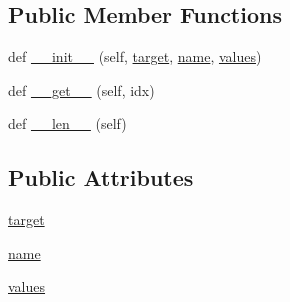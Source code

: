\subsection*{Public Member Functions}
\begin{DoxyCompactItemize}
\item 
def \hyperlink{classcodar_1_1cheetah_1_1parameters_1_1_param_a4c91917ddd306f143286037d02b78034}{\+\_\+\+\_\+init\+\_\+\+\_\+} (self, \hyperlink{classcodar_1_1cheetah_1_1parameters_1_1_param_a5603d43a20cfc6447c3718406ce0669e}{target}, \hyperlink{classcodar_1_1cheetah_1_1parameters_1_1_param_ac9982d62cd18a368a3fbc26541e14209}{name}, \hyperlink{classcodar_1_1cheetah_1_1parameters_1_1_param_aefcc82658f511bddd6605e6ac6e74fbf}{values})
\item 
def \hyperlink{classcodar_1_1cheetah_1_1parameters_1_1_param_ae946fbe90ee7212325e58c9c609b9f60}{\+\_\+\+\_\+get\+\_\+\+\_\+} (self, idx)
\item 
def \hyperlink{classcodar_1_1cheetah_1_1parameters_1_1_param_afe606f18a69519800e93596c1532af8d}{\+\_\+\+\_\+len\+\_\+\+\_\+} (self)
\end{DoxyCompactItemize}
\subsection*{Public Attributes}
\begin{DoxyCompactItemize}
\item 
\hyperlink{classcodar_1_1cheetah_1_1parameters_1_1_param_a5603d43a20cfc6447c3718406ce0669e}{target}
\item 
\hyperlink{classcodar_1_1cheetah_1_1parameters_1_1_param_ac9982d62cd18a368a3fbc26541e14209}{name}
\item 
\hyperlink{classcodar_1_1cheetah_1_1parameters_1_1_param_aefcc82658f511bddd6605e6ac6e74fbf}{values}
\end{DoxyCompactItemize}


